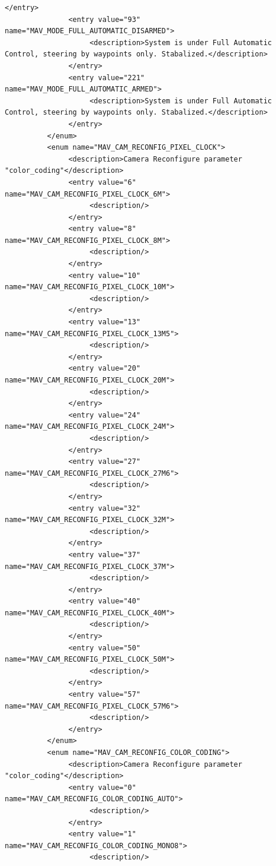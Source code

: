 \begin{lstlisting}[captionpos=b, caption="Definition of \textsc{Skye} specific Mavlink messages", label=app_xml]
               </entry>
               <entry value="93" name="MAV_MODE_FULL_AUTOMATIC_DISARMED">
                    <description>System is under Full Automatic Control, steering by waypoints only. Stabalized.</description>
               </entry>
               <entry value="221" name="MAV_MODE_FULL_AUTOMATIC_ARMED">
                    <description>System is under Full Automatic Control, steering by waypoints only. Stabalized.</description>
               </entry>
          </enum>
          <enum name="MAV_CAM_RECONFIG_PIXEL_CLOCK">
               <description>Camera Reconfigure parameter "color_coding"</description>
               <entry value="6" name="MAV_CAM_RECONFIG_PIXEL_CLOCK_6M">
                    <description/>
               </entry>
               <entry value="8" name="MAV_CAM_RECONFIG_PIXEL_CLOCK_8M">
                    <description/>
               </entry>
               <entry value="10" name="MAV_CAM_RECONFIG_PIXEL_CLOCK_10M">
                    <description/>
               </entry>
               <entry value="13" name="MAV_CAM_RECONFIG_PIXEL_CLOCK_13M5">
                    <description/>
               </entry>
               <entry value="20" name="MAV_CAM_RECONFIG_PIXEL_CLOCK_20M">
                    <description/>
               </entry>
               <entry value="24" name="MAV_CAM_RECONFIG_PIXEL_CLOCK_24M">
                    <description/>
               </entry>
               <entry value="27" name="MAV_CAM_RECONFIG_PIXEL_CLOCK_27M6">
                    <description/>
               </entry>
               <entry value="32" name="MAV_CAM_RECONFIG_PIXEL_CLOCK_32M">
                    <description/>
               </entry>
               <entry value="37" name="MAV_CAM_RECONFIG_PIXEL_CLOCK_37M">
                    <description/>
               </entry>
               <entry value="40" name="MAV_CAM_RECONFIG_PIXEL_CLOCK_40M">
                    <description/>
               </entry>
               <entry value="50" name="MAV_CAM_RECONFIG_PIXEL_CLOCK_50M">
                    <description/>
               </entry>
               <entry value="57" name="MAV_CAM_RECONFIG_PIXEL_CLOCK_57M6">
                    <description/>
               </entry>
          </enum>
          <enum name="MAV_CAM_RECONFIG_COLOR_CODING">
               <description>Camera Reconfigure parameter "color_coding"</description>
               <entry value="0" name="MAV_CAM_RECONFIG_COLOR_CODING_AUTO">
                    <description/>
               </entry>
               <entry value="1" name="MAV_CAM_RECONFIG_COLOR_CODING_MONO8">
                    <description/>

\end{lstlisting}
